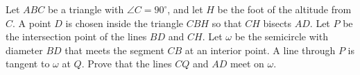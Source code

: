 Let $ABC$ be a triangle with $\angle{C} = 90^{\circ}$, and let $H$ be the foot of the altitude from $C$.
A point $D$ is chosen inside the triangle $CBH$ so that $CH$ bisects $AD$.
Let $P$ be the intersection point of the lines $BD$ and $CH$.
Let $\omega$ be the semicircle with diameter $BD$ that meets the segment $CB$ at an interior point.
A line through $P$ is tangent to $\omega$ at $Q$.
Prove that the lines $CQ$ and $AD$ meet on $\omega$.

